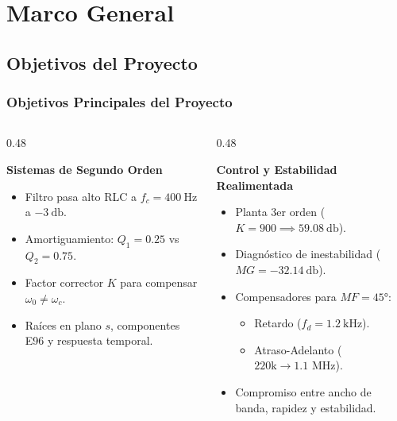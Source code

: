 \documentclass[aspectratio=169, 10pt]{beamer}
\begin{document}
\section{Marco General}
\subsection{Objetivos del Proyecto}
\begin{frame}
  \frametitle{Objetivos Principales del Proyecto}

  \begin{columns}[t, onlytextwidth]
    \begin{column}{0.48\textwidth}
      \begin{tarjeta}
        {\fontsize{9pt}{10.5pt}\selectfont \textbf{\color{NavyDark} Sistemas de Segundo Orden}}\\[2pt]
        {\fontsize{7.5pt}{9pt}\selectfont
        \begin{itemize}\setlength{\itemsep}{2pt}
          \item Filtro pasa alto RLC a $f_c = \qty{400}{\hertz}$ a $\qty{-3}{\decibel}$.
          \item Amortiguamiento: $Q_1 = 0.25$ vs $Q_2 = 0.75$.
          \item Factor corrector $K$ para compensar $\omega_0 \neq \omega_c$.
          \item Raíces en plano $s$, componentes E96 y respuesta temporal.
        \end{itemize}
        }
      \end{tarjeta}
    \end{column}

    \begin{column}{0.48\textwidth}
      \begin{tarjeta}
        {\fontsize{9pt}{10.5pt}\selectfont \textbf{\color{NavyDark} Control y Estabilidad Realimentada}}\\[2pt]
        {\fontsize{7.5pt}{9pt}\selectfont
        \begin{itemize}\setlength{\itemsep}{2pt}
          \item Planta 3er orden ($K = 900 \implies \qty{59.08}{\decibel}$).
          \item Diagnóstico de inestabilidad ($MG = \qty{-32.14}{\decibel}$).
          \item Compensadores para $MF = \ang{45}$:
          \begin{itemize}\setlength{\itemsep}{1pt}
            \item Retardo ($f_d = \qty{1.2}{\kilo\hertz}$).
            \item Atraso-Adelanto ($220\text{k} \to 1.1\text{ MHz}$).
          \end{itemize}
          \item Compromiso entre ancho de banda, rapidez y estabilidad.
        \end{itemize}
        }
      \end{tarjeta}
    \end{column}
  \end{columns}
\end{frame}
\end{document}
